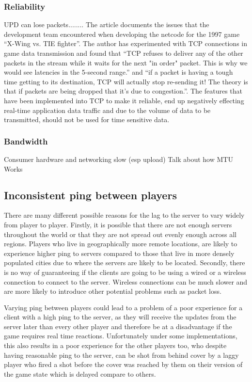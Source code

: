 \subsubsection{Reliability}
UPD can lose packets........ The article  documents the issues that the development team encountered when developing the netcode for the 1997 game ``X-Wing vs. TIE fighter''. The author has experimented with TCP connections in game data transmission and found that ``TCP refuses to deliver any of the other packets in the stream while it waits for the next "in order" packet. This is why we would see latencies in the 5-second range.'' and ``if a packet is having a tough time getting to its destination, TCP will actually stop re-sending it! The theory is that if packets are being dropped that it's due to congestion.''. The features that have been implemented into TCP to make it reliable, end up negatively effecting real-time application data traffic and due to the volume of data to be transmitted, should not be used for time sensitive data.

\subsubsection{Bandwidth}
Consumer hardware and networking slow (esp upload)
Talk about how MTU Works

\subsection{Inconsistent ping between players}
There are many different possible reasons for the lag to the server to vary widely from player to player. Firstly, it is possible that there are not enough servers throughout the world or that they are not spread out evenly enough across all regions. Players who live in geographically more remote locations, are likely to experience higher ping to servers compared to those that live in more densely populated cities due to where the servers are likely to be located. Secondly, there is no way of guaranteeing if the clients are going to be using a wired or a wireless connection to connect to the server. Wireless connections can be much slower and are more likely to introduce other potential problems such as packet loss.

Varying ping between players could lead to a problem of a poor experience for a client with a high ping to the server, as they will receive the updates from the server later than every other player and therefore be at a disadvantage if the game requires real time reactions. Unfortunately under some implementations, this also results in a poor experience for the other players too, who despite having reasonable ping to the server, can be shot from behind cover by a laggy player who fired a shot before the cover was reached by them on their version of the game state which is delayed compare to others.


